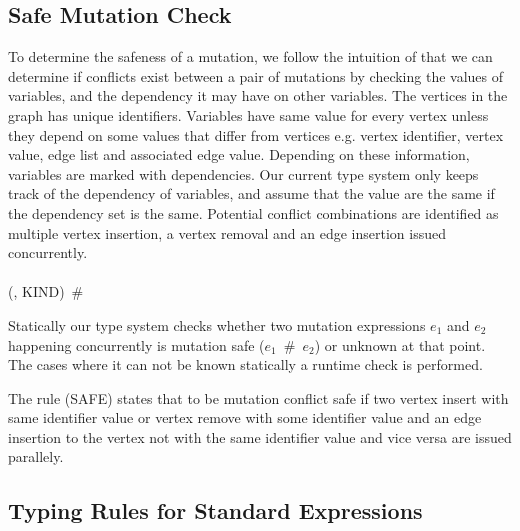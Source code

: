 \subsection{Safe Mutation Check}
\label{subsec:safeMute}

To determine the safeness of a mutation, we follow the intuition of that we can
determine if conflicts exist between a pair of mutations by checking the values
of variables, and the dependency it may have on other variables. The vertices in
the graph has unique identifiers. Variables have same value for every vertex
unless they depend on some values that differ from vertices e.g. vertex
identifier, vertex value, edge list and associated edge value. Depending on
these information, variables are marked with dependencies. Our current type
system only keeps track of the dependency of variables, and assume that the
value are the same if the dependency set is the same. Potential conflict
combinations are identified as multiple vertex insertion, a vertex removal and
an edge insertion issued concurrently.
\ \\
\ \\
    {(\psi , KIND)~\#~\Delta }

\smallskip

Statically our type system checks whether two mutation expressions $e_1$ and $e_2$ happening concurrently is mutation safe ($e_1$~\#~$e_2$) or unknown at that point. The cases where it can not be known statically a runtime check is performed.

The rule (SAFE) states that to be mutation conflict safe if two vertex insert with same identifier value or vertex remove with some identifier value and an edge insertion to the vertex not with the same identifier value and vice versa are issued parallely. 

\subsection{Typing Rules for Standard Expressions}
\label{subsec:standardRules}

